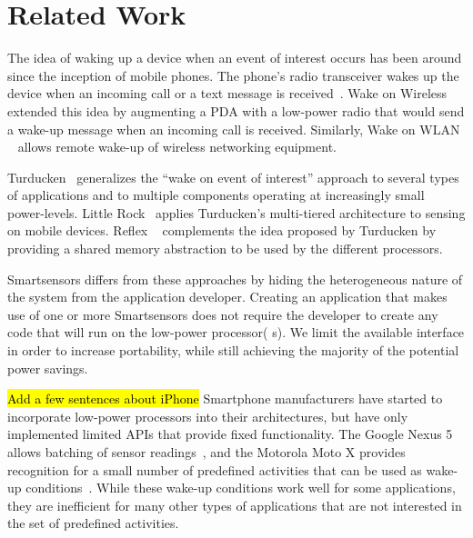 \section{Related Work}\label{sec:related}

The idea of waking up a device when an event of interest occurs has been 
around since the inception of mobile phones. The phone's radio 
transceiver wakes up the device when an incoming call or a text message 
is received~\cite{gobi}. Wake on Wireless~\cite{shih2002wake} extended this idea by 
augmenting a PDA with a low-power radio that would send a wake-up message 
when an incoming call is received. Similarly, Wake on WLAN
~\cite{mishra2006wake} allows remote wake-up of wireless networking
equipment.

Turducken~\cite{turducken} generalizes the ``wake on event of interest'' 
approach to several types of applications and to multiple components 
operating at increasingly small power-levels. Little Rock~\cite{littlerock} 
applies Turducken's multi-tiered architecture to sensing on mobile 
devices. Reflex ~\cite{reflex} complements the idea proposed by Turducken 
by providing a shared memory abstraction to be used by the different 
processors.

Smartsensors differs from these approaches by hiding the heterogeneous 
nature of the system from the application developer. Creating an 
application that makes use of one or more Smartsensors does not require 
the developer to create any code that will run on the low-power processor(
s). We limit the available interface in order to increase portability, 
while still achieving the majority of the potential power savings.

\hl{Add a few sentences about iPhone} Smartphone manufacturers have started to incorporate low-power
processors into their architectures, but have only implemented limited
APIs that provide fixed functionality. The Google Nexus 5 allows
batching of sensor readings~\cite{android4.4,nexus5}, and the
Motorola Moto X provides recognition for a small number of predefined
activities that can be used as wake-up conditions~\cite{motox}. While
these wake-up conditions work well for some applications, they are
inefficient for many other types of applications that are not
interested in the set of predefined activities.

